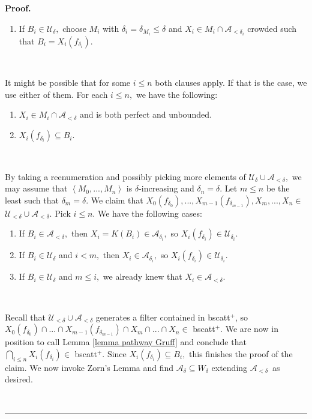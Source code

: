 \documentclass{article}%
\newenvironment{proof}[1][Proof]{\noindent\textbf{#1.} }{\ \rule{0.5em}{0.5em}}
\begin{document}
\begin{proof}
\begin{enumerate}
\item If $B_{i}\in\mathcal{U}_{\delta},$ choose $M_{i}$ with $\delta
_{i}=\delta_{M_{i}}\leq\delta$ and $X_{i}\in M_{i}\cap\mathcal{A}_{<\delta
_{i}}$ crowded such that $B_{i}=X_{i}\left(  f_{\delta_{i}}\right)  .$
\end{enumerate}

\qquad\ \ 

It might be possible that for some $i\leq n$ both clauses apply. If that is
the case, we use either of them. For each $i\leq n,$ we have the following:

\begin{enumerate}
\item $X_{i}\in M_{i}\cap\mathcal{A}_{<\delta}$ and is both perfect and unbounded.

\item $X_{i}\left(  f_{\delta_{i}}\right)  \subseteq B_{i}.$
\end{enumerate}

\qquad\ \ 

By taking a reenumeration and possibly picking more elements of $\mathcal{U}%
_{\delta}\cup\mathcal{A}_{<\delta},$ we may assume that $\left\langle
M_{0},...,M_{n}\right\rangle $ is $\delta$-increasing and $\delta_{n}=\delta.$
Let $m\leq n$ be the least such that $\delta_{m}=\delta.$ We claim that
$X_{0}\left(  f_{\delta_{0}}\right)  ,...,X_{m-1}\left(  f_{\delta_{m-1}%
}\right)  ,X_{m},...,X_{n}\in$ $\mathcal{U}_{<\delta}\cup\mathcal{A}_{<\delta
}.$ Pick $i\leq n.$ We have the following cases:

\begin{enumerate}
\item If $B_{i}\in\mathcal{A}_{<\delta},$ then $X_{i}=K\left(  B_{i}\right)
\in\mathcal{A}_{\delta_{i}},$ so $X_{i}\left(  f_{\delta_{i}}\right)
\in\mathcal{U}_{\delta_{i}}$.

\item If $B_{i}\in\mathcal{U}_{\delta}$ and $i<m,$ then $X_{i}\in
\mathcal{A}_{\delta_{i}},$ so $X_{i}\left(  f_{\delta_{i}}\right)
\in\mathcal{U}_{\delta_{i}}$.

\item If $B_{i}\in\mathcal{U}_{\delta}$ and $m\leq i,$ we already knew that
$X_{i}\in\mathcal{A}_{<\delta}.$
\end{enumerate}

\qquad\ \ \ \qquad\ \ \ \ \ 

Recall that $\mathcal{U}_{<\delta}\cup\mathcal{A}_{<\delta}$ generates a
filter contained in \textsf{bscatt}$^{+}$, so $X_{0}\left(  f_{\delta_{0}%
}\right)  \cap...\cap X_{m-1}\left(  f_{\delta_{m-1}}\right)  \cap X_{m}%
\cap...\cap X_{n}\in$ \textsf{bscatt}$^{+}$. We are now in position to call
Lemma \ref{lemma pathway Gruff} and conclude that $%
{\textstyle\bigcap\limits_{i\leq n}}
X_{i}\left(  f_{\delta_{i}}\right)  \in$ \textsf{bscatt}$^{+}$. Since
$X_{i}\left(  f_{\delta_{i}}\right)  \subseteq B_{i},$ this finishes the proof
of the claim. We now invoke Zorn's Lemma and find $\mathcal{A}_{\delta
}\subseteq W_{\delta}$ extending $\mathcal{A}_{<\delta}$\ as desired.


\end{proof}
\end{document}

